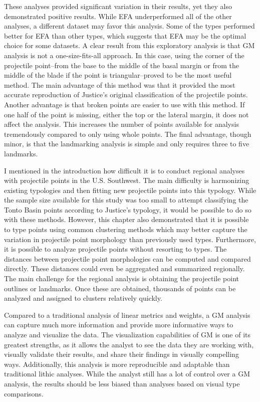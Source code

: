 \documentclass[a4paper]{article}
\begin{document}
These analyses provided significant variation in their results, yet they also demonstrated positive results. While EFA underperformed all of the other analyses, a different dataset may favor this analysis. Some of the types performed better for EFA than other types, which suggests that EFA may be the optimal choice for some datasets. A clear result from this exploratory analysis is that GM analysis is not a one-size-fits-all approach. In this case, using the corner of the projectile point--from the base to the middle of the basal margin or from the middle of the blade if the point is triangular--proved to be the most useful method. The main advantage of this method was that it provided the most accurate reproduction of Justice's original classification of the projectile points. Another advantage is that broken points are easier to use with this method. If one half of the point is missing, either the top or the lateral margin, it does not affect the analysis. This increases the number of points available for analysis tremendously compared to only using whole points. The final advantage, though minor, is that the landmarking analysis is simple and only requires three to five landmarks.

I mentioned in the introduction how difficult it is to conduct regional analyses with projectile points in the U.S. Southwest. The main difficulty is harmonizing existing typologies and then fitting new projectile points into this typology. While the sample size available for this study was too small to attempt classifying the Tonto Basin points according to Justice's typology, it would be possible to do so with these methods. However, this chapter also demonstrated that it is possible to type points using common clustering methods which may better capture the variation in projectile point morphology than previously used types. Furthermore, it is possible to analyze projectile points without resorting to types. The distances between projectile point morphologies can be computed and compared directly. These distances could even be aggregated and summarized regionally. The main challenge for the regional analysis is obtaining the projectile point outlines or landmarks. Once these are obtained, thousands of points can be analyzed and assigned to clusters relatively quickly.

Compared to a traditional analysis of linear metrics and weights, a GM analysis can capture much more information and provide more informative ways to analyze and visualize the data. The visualization capabilities of GM is one of its greatest strengths, as it allows the analyst to see the data they are working with, visually validate their results, and share their findings in visually compelling ways. Additionally, this analysis is more reproducible and adaptable than traditional lithic analyses. While the analyst still has a lot of control over a GM analysis, the results should be less biased than analyses based on visual type comparisons.
\end{document}
